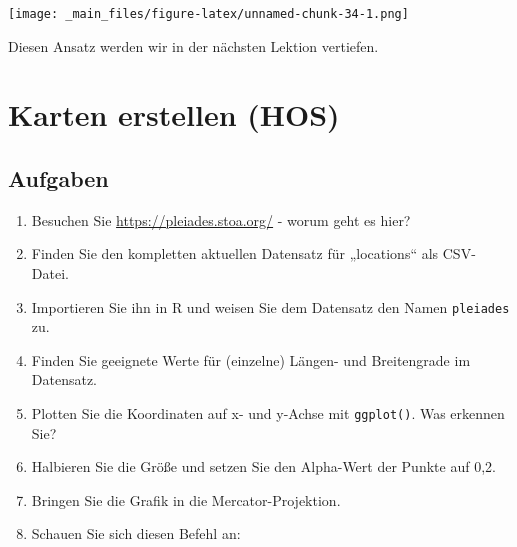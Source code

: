 \documentclass[
  ngerman,
]{article}
\begin{document}
\texttt{[image: \_main\_files/figure-latex/unnamed-chunk-34-1.png]}

Diesen Ansatz werden wir in der nächsten Lektion vertiefen.

\hypertarget{karten-erstellen-hos}{%
\section{Karten erstellen (HOS)}\label{karten-erstellen-hos}}

\hypertarget{aufgaben-1}{%
\subsection{Aufgaben}\label{aufgaben-1}}

\begin{enumerate}
\def\labelenumi{\arabic{enumi}.}
\item
  Besuchen Sie \url{https://pleiades.stoa.org/} - worum geht es hier?
\item
  Finden Sie den kompletten aktuellen Datensatz für „locations`` als CSV-Datei.
\item
  Importieren Sie ihn in R und weisen Sie dem Datensatz den Namen \texttt{pleiades} zu.
\item
  Finden Sie geeignete Werte für (einzelne) Längen- und Breitengrade im Datensatz.
\item
  Plotten Sie die Koordinaten auf x- und y-Achse mit \texttt{ggplot()}. Was erkennen Sie?
\item
  Halbieren Sie die Größe und setzen Sie den Alpha-Wert der Punkte auf 0,2.
\item
  Bringen Sie die Grafik in die Mercator-Projektion.
\item
  Schauen Sie sich diesen Befehl an:


\end{enumerate}
\end{document}
